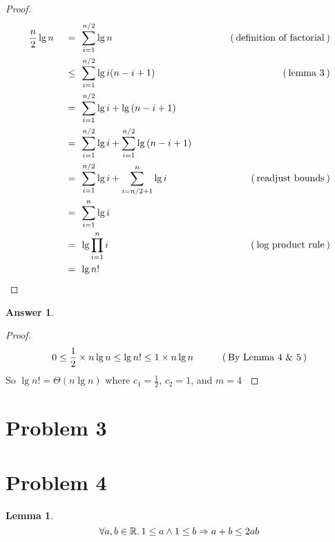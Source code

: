 \documentclass{article}
\newtheorem{lemma}{Lemma}
\theoremstyle{definition}
\newtheorem*{answer}{Answer}
\newcommand{\evidence}[1]{\ensuremath{\hspace{3em} (\hspace{0.2em} \text{#1} \hspace{0.2em})}}
\newcommand{\asymptotic}[3]{\ensuremath{#2 = #1(#3)}}
\newcommand{\bigTheta}[2]{\asymptotic{\Theta}{#1}{#2}}
\newcommand{\relation}[1]{\ensuremath{\hspace{0.2em} {{} #1 {}} \hspace{0.2em}}}
\newcommand{\equal}{\relation{=}}
\newcommand{\lesseq}{\relation{\le}}
\newcommand{\quantify}[2]{\ensuremath{\forall #1 \in \mathbb{#2}. \hspace{0.2em}}}
\begin{document}
\begin{proof}
  \hfill
  \begin{alignat*}{4}
    & \frac{n}{2}\lg{n} & \equal  & \sum_{i=1}^{n/2}{\lg{n}}            & \evidence{definition of factorial} \\
    & {}                & \lesseq & \sum_{i=1}^{n/2}{\lg{i(n - i + 1)}} & \evidence{lemma 3} \\
    & {}                & \equal  & \sum_{i=1}^{n/2}{\lg{i} + \lg{(n - i + 1)}} & {} \\
    & {}                & \equal  & \sum_{i=1}^{n/2}{\lg{i}} + \sum_{i=1}^{n/2}{\lg{(n - i + 1)}} & {} \\
    & {}                & \equal  & \sum_{i=1}^{n/2}{\lg{i}} + \sum_{i=n/2 + 1}^{n}{\lg{i}} & \evidence{readjust bounds} \\
    & {}                & \equal  & \sum_{i=1}^{n}{\lg{i}}   & {} \\
    & {}                & \equal  & \lg{\prod_{i=1}^{n}{i}}  & \evidence{log product rule} \\
    & {}                & \equal  & \lg{n!}                 & \qedhere
  \end{alignat*}
\end{proof}

\begin{answer}
  \hfill
  \begin{proof}
    \vspace{1em}
    \begin{equation*}
      0 \le \frac{1}{2} \times n \lg{n} \le \lg{n!} \le 1 \times n\lg{n} \evidence{By Lemma 4 $\&$ 5}
    \end{equation*}
    So $\bigTheta{\lg{n!}}{n\lg{n}}$ where $c_1 = \frac{1}{2}$, $c_2 = 1$, and $m = 4$ $\qedhere$ 
  \end{proof}
\end{answer}

\section*{Problem 3}

\section*{Problem 4}

\begin{lemma}
  \begin{equation*}
    \quantify{a, b}{R} 1 \le a \wedge 1 \le b \Rightarrow a + b \le 2ab
  \end{equation*}
\end{lemma}
\end{document}
